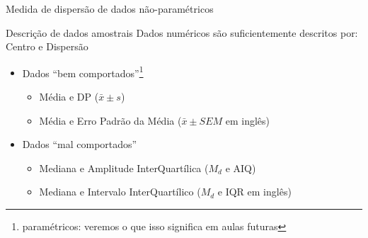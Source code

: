 \documentclass{beamer}
\begin{document}
\begin{frame}{\scriptsize Medida de dispersão de dados não-paramétricos}
  \begin{block}{Descrição de dados amostrais}
    \scriptsize
    Dados numéricos são suficientemente descritos por: Centro e Dispersão

    \bigskip
    \begin{itemize}
      \footnotesize
    \item Dados ``bem comportados''\footnote{\scriptsize paramétricos: veremos o que isso significa em aulas futuras}
      \begin{itemize}
        \scriptsize
      \item Média e DP \Left($\bar{x} \pm s$\Right)
      \item Média e Erro Padrão da Média \Left($\bar{x} \pm SEM$ {\tiny em inglês}\Right)
      \end{itemize}
      \bigskip
    \item Dados ``mal comportados''
      \begin{itemize}
        \scriptsize
      \item Mediana e Amplitude InterQuartílica \Left($M_d$ e AIQ\Right)
      \item Mediana e  Intervalo InterQuartílico \Left($M_d$ e IQR {\tiny em inglês}\Right)
      \end{itemize}
    \end{itemize}
  \end{block}
\end{frame}
\end{document}
